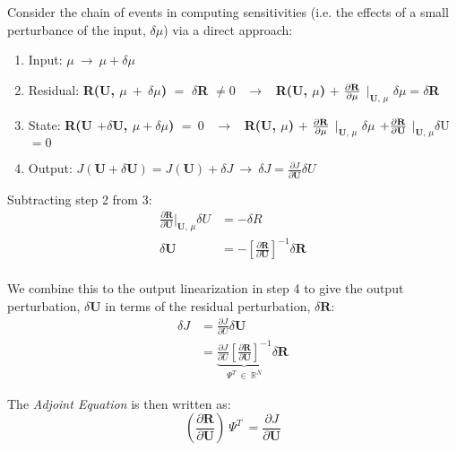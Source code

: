 Consider the chain of events in computing sensitivities (i.e. the effects of a small perturbance of the input, $\delta \mu$) via a direct approach:
\begin{enumerate}
\item Input:  $\mu ~\to~ \mu + \delta \mu$
\item Residual: \textbf{R(U, $\mu ~+~ \delta \mu$)} $=$ $\delta$\textbf{R} $\neq 0$ ~$\to$~ \textbf{R(U, $\mu$)} $+$ $\frac{\partial \text{\textbf{R}}}{\partial \mu}$ $\bigg|_{\textbf{U, $\mu$}}$ $\delta \mu = \delta$\textbf{R}
\item State: \textbf{R(U $+ \delta$U, $ \mu + \delta\mu$)} $= ~0$ ~$\to$~ \textbf{R(U, $\mu$)} $+$ $\frac{\partial \text{\textbf{R}}}{\partial \mu}$ $\bigg|_{\textbf{U, $\mu$}}$ $\delta \mu$ $ + \frac{\partial \text{\textbf{R}}}{\partial \text{\textbf{U}}}$     $\bigg|_{\textbf{U, $\mu$}} \delta$U  $ = 0$
\item Output: $J(\textbf{U} + \delta \textbf{U}) = J(\textbf{U}) + \delta J ~\to~ \delta J = \frac{\partial J}{\partial \textbf{U}} \delta U $
\end{enumerate}

Subtracting step 2 from 3:
\begin{equation}
\begin{split}
\frac{\partial \textbf{R}} {\partial \textbf{U}} \bigg|_{\textbf{U, $\mu$}} \delta U &= - \delta R \\
\delta \textbf{U} &= - \left[\frac{\partial \textbf{R}}{\partial \textbf{U}} \right]^{-1} \delta \textbf{R} \\
\end{split}
\end{equation}

We combine this to the output linearization in step 4 to give the output perturbation, $\delta \textbf{U}$ in terms of the residual perturbation, $\delta \textbf{R}$:
\begin{equation}
\begin{split}
\delta J &= \frac{\partial J}{\partial U} \delta \textbf{U} \\
& = \underbrace{\frac{\partial J}{\partial U} \left[\frac{\partial \textbf{R}}{\partial \textbf{U}} \right]^{-1}}_{\Psi^T ~\in~ \mathbb{R}^\textit{N}} \delta \textbf{R}
\end{split}
\end{equation}

The \textit{Adjoint Equation} is then written as:
\begin{equation}
\left( \frac{\partial \textbf{R}}{\partial \textbf{U}} \right) ~\Psi^T~ = \frac{\partial J}{\partial \textbf{U}}
\end{equation}

